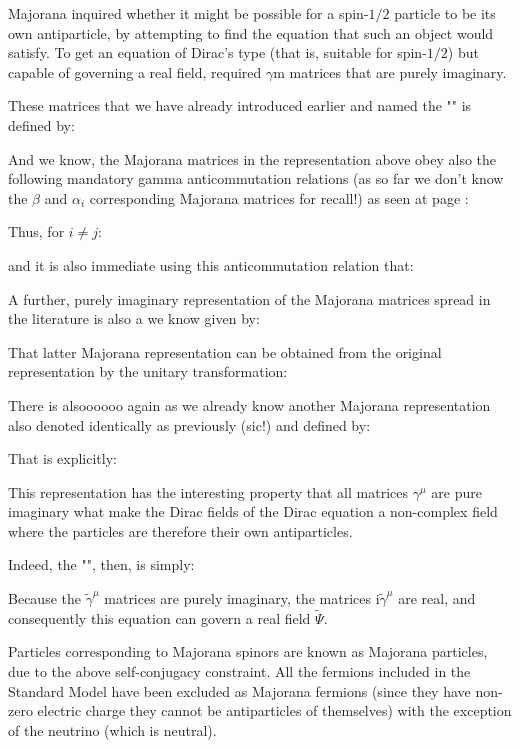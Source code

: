 	Majorana inquired whether it might be possible for a spin-$1/2$ particle to be its own antiparticle, by attempting to find the equation that such an object would satisfy. To get an equation of Dirac's type (that is, suitable for spin-$1/2$) but capable of governing a real field, required $\gamma$m matrices that are purely imaginary.
	
	These matrices that we have already introduced earlier and named the "" is defined by:
	
	And we know, the Majorana matrices in the representation above obey also the following mandatory gamma anticommutation relations (as so far we don't know the $\beta$ and $\alpha_i$ corresponding Majorana matrices for recall!) as seen at page \pageref{gamma anticommutation relations}:
	
	Thus, for $i\neq j$:
	
	and it is also immediate using this anticommutation relation that:
	
	A further, purely imaginary representation of the Majorana matrices spread in the literature is also a we know given by:
	
	That latter Majorana representation can be obtained from the original representation by the unitary transformation:
	
	There is alsoooooo again as we already know another Majorana representation also denoted identically as previously (sic!) and defined by:
	
	That is explicitly:
	
	This representation has the interesting property that all matrices $\gamma^\mu$ are pure imaginary what make the Dirac fields of the Dirac equation a non-complex field where the particles are therefore their own antiparticles.
	
	Indeed, the "", then, is simply:
	
	Because the $\tilde{\gamma}^\mu$ matrices are purely imaginary, the matrices $\mathrm{i}\tilde{\gamma}^\mu$ are real, and consequently this equation can govern a real field $\tilde{\Psi}$.
	
	Particles corresponding to Majorana spinors are known as Majorana particles, due to the above self-conjugacy constraint. All the fermions included in the Standard Model have been excluded as Majorana fermions (since they have non-zero electric charge they cannot be antiparticles of themselves) with the exception of the neutrino (which is neutral).

